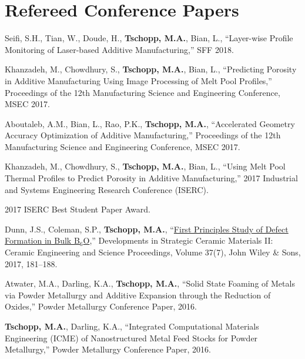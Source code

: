 \section{\sc Refereed Conference Papers}

\begin{cvlist}
\setlength{\itemsep}{0in}
\setlength{\parsep}{0in} 
\setlength{\parskip}{0in}
\setlength{\topsep}{0in} 
\setlength{\partopsep}{0in} 
\setlength{\leftmargin}{0.2in}

\item
Seifi, S.H., Tian, W., Doude, H., \textbf{Tschopp, M.A.}, Bian, L., ``Layer-wise Profile Monitoring of Laser-based Additive Manufacturing,'' SFF 2018.

\item
{Khanzadeh, M.}, Chowdhury, S., \textbf{Tschopp, M.A.}, Bian, L., ``Predicting Porosity in Additive Manufacturing Using Image Processing of Melt Pool Profiles,'' Proceedings of the 12th Manufacturing Science and Engineering Conference, MSEC 2017.

\item
{Aboutaleb, A.M.}, Bian, L., Rao, P.K., \textbf{Tschopp, M.A.}, ``Accelerated Geometry Accuracy Optimization of Additive Manufacturing,'' Proceedings of the 12th Manufacturing Science and Engineering Conference, MSEC 2017.

\item
{Khanzadeh, M.}, Chowdhury, S., \textbf{Tschopp, M.A.}, Bian, L., ``Using Melt Pool Thermal Profiles to Predict Porosity in Additive Manufacturing,'' 2017 Industrial and Systems Engineering Research Conference (ISERC).
\begin{list2}
\item[$\star$] 2017 ISERC Best Student Paper Award.
\end{list2}

\item
Dunn, J.S., Coleman, S.P., \textbf{Tschopp, M.A.}, ``\href{http://dx.doi.org/10.1002/9781119321811.ch17}{First Principles Study of Defect Formation in Bulk B$_6$O},'' Developments in Strategic Ceramic Materials II: Ceramic Engineering and Science Proceedings,  Volume 37(7), John Wiley \& Sons, 2017, 181--188.

\item
Atwater, M.A., Darling, K.A., \textbf{Tschopp, M.A.}, ``Solid State Foaming of Metals via Powder Metallurgy and Additive Expansion through the Reduction of Oxides,'' Powder Metallurgy Conference Paper, 2016.

\item
\textbf{Tschopp, M.A.}, Darling, K.A., ``Integrated Computational Materials Engineering (ICME) of Nanostructured Metal Feed Stocks for Powder Metallurgy,'' Powder Metallurgy Conference Paper, 2016.


\end{cvlist}
